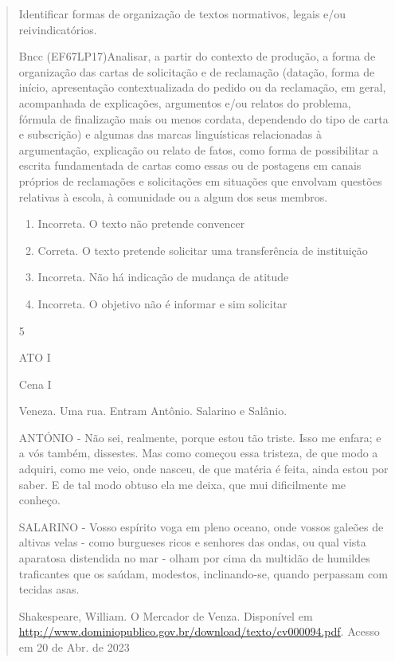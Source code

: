{\begin{quote}
{\begin{itemize}
\begin{itemize}
Identificar formas de organização de textos normativos, legais e/ou
reivindicatórios.

Bncc (EF67LP17)Analisar, a partir do contexto de produção, a forma de
organização das cartas de solicitação e de reclamação (datação, forma de
início, apresentação contextualizada do pedido ou da reclamação, em
geral, acompanhada de explicações, argumentos e/ou relatos do problema,
fórmula de finalização mais ou menos cordata, dependendo do tipo de
carta e subscrição) e algumas das marcas linguísticas relacionadas à
argumentação, explicação ou relato de fatos, como forma de possibilitar
a escrita fundamentada de cartas como essas ou de postagens em canais
próprios de reclamações e solicitações em situações que envolvam
questões relativas à escola, à comunidade ou a algum dos seus membros.

\begin{enumerate}
\def\labelenumi{\arabic{enumi}.}
\item
  Incorreta. O texto não pretende convencer
\item
  Correta. O texto pretende solicitar uma transferência de instituição
\item
  Incorreta. Não há indicação de mudança de atitude
\item
  Incorreta. O objetivo não é informar e sim solicitar
\end{enumerate}

\num{5}

ATO I

Cena I

Veneza. Uma rua. Entram Antônio. Salarino e Salânio.

ANTÓNIO - Não sei, realmente, porque estou tão triste. Isso me enfara; e
a vós também, dissestes. Mas como começou essa tristeza, de que modo a
adquiri, como me veio, onde nasceu, de que matéria é feita, ainda estou
por saber. E de tal modo obtuso ela me deixa, que mui dificilmente me
conheço.

SALARINO - Vosso espírito voga em pleno oceano, onde vossos galeões de
altivas velas - como burgueses ricos e senhores das ondas, ou qual vista
aparatosa distendida no mar - olham por cima da multidão de humildes
traficantes que os saúdam, modestos, inclinando-se, quando perpassam com
tecidas asas.

Shakespeare, William. O Mercador de Venza. Disponível em
\href{http://www.dominiopublico.gov.br/download/texto/cv000094.pdf}{\uline{http://www.dominiopublico.gov.br/download/texto/cv000094.pdf}}.
Acesso em 20 de Abr. de 2023


\end{itemize}
\end{itemize}}
\end{quote}}
